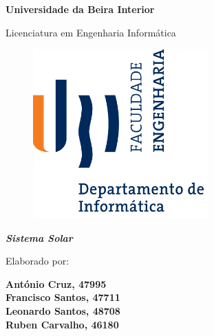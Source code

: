 
\thispagestyle{empty}
\setcounter{page}{-1}

\begin{center}
\begin{Huge}
\textbf{Universidade da Beira Interior}
\end{Huge}
\end{center}

\begin{center}
\begin{Huge}
Licenciatura em Engenharia Informática
\end{Huge}
\end{center}

\vspace{0,07cm}
\begin{figure}[!htb]
\centering
\includegraphics[width=191pt]{ubi-fe-di.png}
\end{figure}

\vspace{0.5cm}
\begin{center}
\begin{Large}
\textbf{\emph{Sistema Solar}}
\end{Large}
\end{center}


\vspace{0.15cm}
\begin{center}
\begin{normalsize}
\begin{large}
Elaborado por:
\end{large}
\end{normalsize}
\end{center}

\vspace{0.005cm}
\begin{center}
\textbf{António Cruz, 47995} \\
\textbf{Francisco Santos, 47711} \\
\textbf{Leonardo Santos, 48708} \\
\textbf{Ruben Carvalho, 46180}
\end{center}




